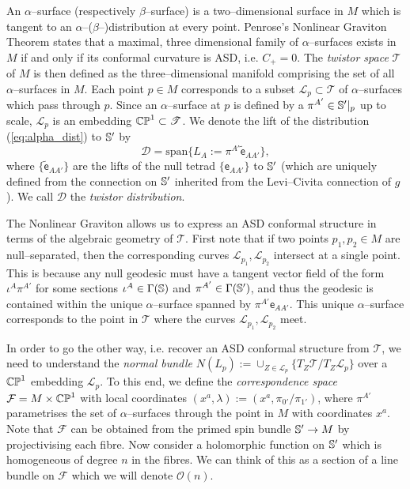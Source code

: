 An $\alpha$--surface (respectively $\beta$--surface) is a two--dimensional surface in $M$ which is tangent to an $\alpha$--($\beta$--)distribution at every point. Penrose's Nonlinear Graviton Theorem \cite{penrose} states that a 
maximal, three dimensional family of $\alpha$--surfaces exists in $M$ if and only if its conformal curvature is ASD, i.e. $C_+=0$. The \textit{twistor space} $\mathscr{T}$ of $M$ is then defined as the three--dimensional manifold comprising the set of all $\alpha$--surfaces in $M$. Each point $p\in M$ corresponds to a subset $\mathscr{L}_p\subset\mathscr{T}$ of $\alpha$--surfaces which pass through $p$. Since an $\alpha$--surface at $p$ is defined by a $\pi^{A'}\in\mathbb{S}'|_p$ up to scale, $\mathscr{L}_p$ is an embedding $\mathbb{CP}^1\subset\mathscr{T}$. We denote the lift of the distribution (\ref{eq:alpha_dist}) to $\mathbb{S}'$ by
\[
\mathcal{D}=\mathrm{span}\{L_A:=\pi^{A'}\tilde{\mathsf{e}}_{AA'}\},
\]
where $\{\tilde{\mathsf{e}}_{AA'}\}$ are the lifts of the null tetrad $\{\mathsf{e}_{AA'}\}$ to $\mathbb{S}'$ (which are uniquely defined from the connection on $\mathbb{S}'$ inherited from the Levi--Civita connection of $g$). We call $\mathcal{D}$ the \textit{twistor distribution}.

The Nonlinear Graviton allows us to express an ASD conformal structure in terms of the algebraic geometry of $\mathscr{T}$. First note that if two points $p_1,p_2\in M$ are null--separated, then the corresponding curves $\mathscr{L}_{p_1},\mathscr{L}_{p_2}$ intersect at a single point. This is because any null geodesic must have a tangent vector field of the form $\iota^A\pi^{A'}$ for some sections $\iota^A\in\Gamma(\mathbb{S})$ and $\pi^{A'}\in\Gamma(\mathbb{S}')$, and thus the geodesic is contained within the unique $\alpha$--surface spanned by $\pi^{A'}\mathsf{e}_{AA'}$. This unique $\alpha$--surface corresponds to the point in $\mathscr{T}$ where the curves $\mathscr{L}_{p_1},\mathscr{L}_{p_2}$ meet.

In order to go the other way, i.e. recover an ASD conformal structure from $\mathscr{T}$, we need to understand the \textit{normal bundle} $N(L_p):=\cup_{Z\in \mathscr{L}_p}\{T_Z\mathscr{T}/T_Z\mathscr{L}_p\}$ over a $\mathbb{CP}^1$ embedding $\mathscr{L}_p$. To this end, we define the \textit{correspondence space} $\mathcal{F}=M\times\mathbb{CP}^1$ with local coordinates $(x^a,\lambda):=(x^a,\pi_{0'}/\pi_{1'})$, where $\pi^{A'}$ parametrises the set of $\alpha$--surfaces through the point in $M$ with coordinates $x^a$. Note that $\mathcal{F}$ can be obtained from the primed spin bundle $\mathbb{S}'\rightarrow M$ by projectivising each fibre. Now consider a holomorphic function on $\mathbb{S}'$ which is homogeneous of degree $n$ in the fibres. We can think of this as a section of a line bundle on $\mathcal{F}$ which we will denote $\mathcal{O}(n)$. 

